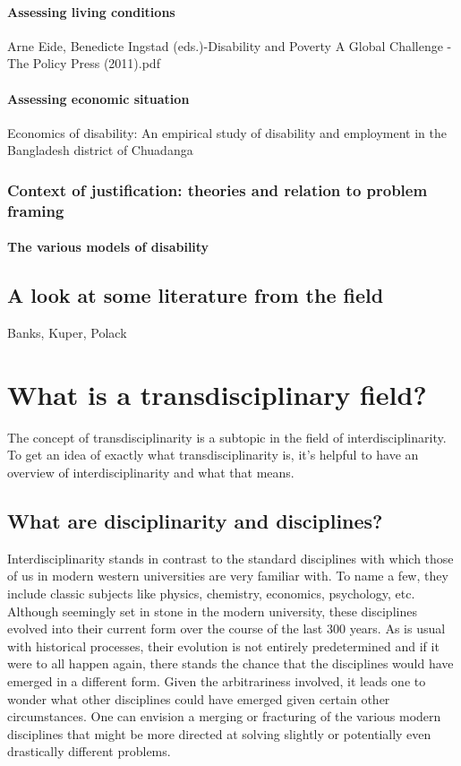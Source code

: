 \documentclass{lps}
\begin{document}
\paragraph{Assessing living conditions}

Arne Eide, Benedicte Ingstad (eds.)-Disability and Poverty A Global Challenge
-The Policy Press (2011).pdf

\paragraph{Assessing economic situation}

Economics of disability: An empirical study of disability and employment in
the Bangladesh district of Chuadanga

\subsubsection{Context of justification: theories and relation to problem
framing}

\paragraph{The various models of disability}

\subsection{A look at some literature from the field}

Banks, Kuper, Polack

\section{What is a transdisciplinary field?}

The concept of transdisciplinarity is a subtopic in the field of
interdisciplinarity. To get an idea of exactly what transdisciplinarity is,
it’s helpful to have an overview of interdisciplinarity and what that means.

\subsection{What are disciplinarity and disciplines?}

Interdisciplinarity stands in contrast to the standard disciplines with which
those of us in modern western universities are very familiar with. To name a
few, they include classic subjects like physics, chemistry, economics,
psychology, etc. Although seemingly set in stone in the modern university,
these disciplines evolved into their current form over the course of the last
300 years. As is usual with historical processes, their evolution is not
entirely predetermined and if it were to all happen again, there stands the
chance that the disciplines would have emerged in a different form. Given the
arbitrariness involved, it leads one to wonder what other disciplines could
have emerged given certain other circumstances. One can envision a merging or
fracturing of the various modern disciplines that might be more directed at
solving slightly or potentially even drastically different problems. 
\end{document}
